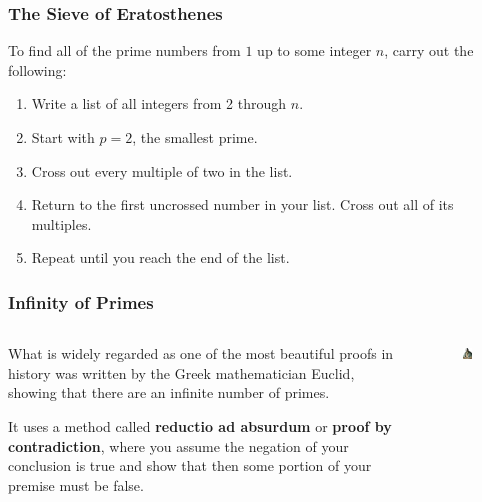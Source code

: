 \documentclass{beamer}
\newcommand{\<}{\langle}
\renewcommand{\>}{\rangle}
\begin{document}
\begin{frame}
\frametitle{The Sieve of Eratosthenes}

To find all of the prime numbers from $1$ up to some integer $n$, carry out the following:
\begin{enumerate}[(1)]
\item Write a list of all integers from 2 through $n$.
\item Start with $p=2$, the smallest prime.
\item Cross out every multiple of two in the list.
\item Return to the first uncrossed number in your list. Cross out all of its multiples.
\item Repeat until you reach the end of the list.
\end{enumerate}
\end{frame}


\begin{frame}
\frametitle{Infinity of Primes}

\begin{columns}
\begin{column}{0.5\textwidth}
What is widely regarded as one of the most beautiful proofs in history was written by the Greek mathematician Euclid, showing that there are an infinite number of primes. \newline

It uses a method called \textbf{reductio ad absurdum} or \textbf{proof by contradiction}, where you assume the negation of your conclusion is true and show that then some portion of your premise must be false. 
\end{column}
\begin{column}{0.5\textwidth}
\begin{figure}
\includegraphics[scale=.5]{IMG/euclid.jpg}
\end{figure}
\end{column}
\end{columns}
\end{frame}
\end{document}
